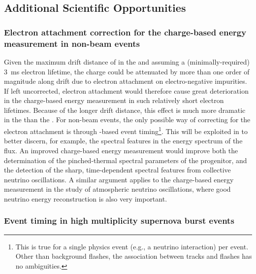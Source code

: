 
\subsection{Additional Scientific Opportunities}
\label{subsec:dp-pds-requirements_opportunities}

\subsubsection{Electron attachment correction for the charge-based energy measurement in non-beam events}
\label{subsubsec:dp-pds-requirements_attachment}

Given the maximum drift distance of \dpmaxdrift in the \dual {} and assuming a (minimally-required) \SI{3}{\ms} electron lifetime, the charge could be attenuated by more than one order of magnitude along drift due to electron attachment on electro-negative impurities. If left uncorrected, electron attachment would therefore cause great deterioration in the charge-based energy measurement in such relatively short electron lifetimes. Because of the longer drift distance, this effect is much more dramatic in the  than the . For non-beam events, the only possible way of correcting for the electron attachment is through -based event timing\footnote{This is true for a single physics event (e.g., a neutrino interaction) per  event. Other than background flashes, the association between  tracks and  flashes has no ambiguities.}. This will be exploited in \dune to better discern, for example, the spectral features in the energy spectrum of the  flux. An improved charge-based energy measurement would improve both the determination of the pinched-thermal spectral parameters of the progenitor, and the detection of the sharp, time-dependent spectral features from collective neutrino oscillations. A similar argument applies to the charge-based energy measurement in the study of atmospheric neutrino oscillations, where good neutrino energy reconstruction is also very important.

\subsubsection{Event timing in high multiplicity supernova burst events}

